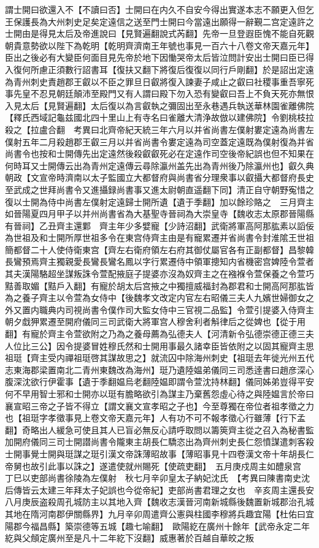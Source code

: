 謂士開曰欲還入不【不讀曰否】士開曰在内久不自安今得出實遂本志不願更入但乞王保護長為大州刺史足矣定遠信之送至門士開曰今當遠出願得一辭覲二宫定遠許之士開由是得見太后及帝進說曰【見賢遍翻說式芮翻】先帝一旦登遐臣愧不能自死觀朝貴意勢欲以陛下為乾明【乾明齊濟南王年號也事見一百六十八卷文帝天嘉元年】臣出之後必有大變臣何面目見先帝於地下因慟哭帝太后皆泣問計安出士開曰臣已得入復何所慮正須數行詔書耳【復扶又翻下將復后復復以同行戶剛翻】於是詔出定遠為青州刺史責趙郡王叡以不臣之罪旦日叡將復入諫妻子咸止之叡曰社稷事重吾寧死事先皇不忍見朝廷顛沛至殿門又有人謂曰殿下勿入恐有變叡曰吾上不負天死亦無恨入見太后【見賢遍翻】太后復以為言叡執之彌固出至永巷遇兵執送華林園雀離佛院【釋氏西域記龜兹國北四十里山上有寺名曰雀離大清浄故倣以建佛院】令劉桃枝拉殺之【拉盧合翻　考異曰北齊帝紀天統三年六月以并省尚書左僕射婁定遠為尚書左僕射五年二月殺趙郡王叡三月以并省尚書令婁定遠為司空蓋定遠既為僕射復為并省尚書令也按和士開傳先出定遠然後殺叡叡死必在定遠作司空後帝紀誤也但不知果在何時耳又士開傳云出為青州定遠傳云尋除瀛州盖先出為青州後乃除瀛州也】叡久典朝政【文宣帝時濟南以太子監國立大都督府與尚書省分理衆事以叡攝大都督府長史至武成之世拜尚書令又進攝録尚書事又進太尉朝直遥翻下同】清正自守朝野寃惜之復以士開為侍中尚書左僕射定遠歸士開所遺【遺于季翻】加以餘珍賂之　三月齊主如晉陽夏四月甲子以并州尚書省為大基聖寺晉祠為大崇皇寺【魏收志太原郡晉陽縣有晉祠】乙丑齊主還鄴　齊主年少多嬖寵【少詩沼翻】武衛將軍高阿那肱素以謟佞為世祖及和士開所厚世祖多令在東宫侍齊主由是有寵累遷并省尚書令封淮隂王世祖簡都督二十人使侍衛東宫【齊左右衛府領左右府其御仗屬官各有正副都督】昌黎韓長鸞預焉齊主獨親愛長鸞長鸞名鳳以字行累遷侍中領軍摠知内省機密宫婢陸令萱者其夫漢陽駱超坐謀叛誅令萱配掖庭子提婆亦沒為奴齊主之在襁褓令萱保養之令萱巧黠善取媚【黠戶入翻】有寵於胡太后宫掖之中獨擅威福封為郡君和士開高阿那肱皆為之養子齊主以令萱為女侍中【後魏孝文改定内官左右昭儀三夫人九嬪世婦御女之外又置内職典内司視尚書令僕作司大監女侍中三官視二品監】令萱引提婆入侍齊主朝夕戱狎累遷至開府儀同三司武衛大將軍宫人穆舍利者斛律后之從婢也【從于用翻】有寵於齊主令萱欲附之乃為之養母薦為弘德夫人【河清新令弘德崇德正德三夫人位比三公】因令提婆冒姓穆氏然和士開用事最久諸幸臣皆依附之以固其寵齊主思祖珽【齊主受内禪祖珽啓其謀故思之】就流囚中除海州刺史【祖珽去年徙光州五代志東海郡梁置南北二青州東魏改為海州】珽乃遺陸媪弟儀同三司悉逹書曰趙彦深心腹深沈欲行伊霍事【遺于季翻媪烏老翻陸媪即謂令萱沈持林翻】儀同姊弟豈得平安何不早用智士邪和士開亦以珽有膽略欲引為謀主乃棄舊怨虛心待之與陸媪言於帝曰襄宣昭三帝之子皆不得立【謂文襄文宣孝昭之子也】今至尊獨在帝位者祖孝徵之力也【祖珽字孝徵事見上卷文帝天嘉元年】人有功不可不報孝徵心行雖薄【行下孟翻】奇略出人緩急可使且其人已盲必無反心請呼取問以籌筴齊主從之召入為秘書監加開府儀同三司士開譛尚書令隴東主胡長仁驕恣出為齊州刺史長仁怨憤謀遣刺客殺士開事覺士開與珽謀之珽引漢文帝誅薄昭故事【薄昭事見十四卷漢文帝十年胡長仁帝舅也故引此事以誅之】遂遣使就州賜死【使疏吏翻】　五月庚戍周主如醴泉宫　丁巳以吏部尚書徐陵為左僕射　秋七月辛卯皇太子納妃沈氏　【考異曰陳書南史沈后傳皆云太建三年拜太子妃誤也今從帝紀】吏部尚書君理之女也　辛亥周主還長安　八月庚辰盗殺周孔城防主以其地入齊【魏收志漢晉河南新城縣後魏置新城郡治孔城其地在隋河南郡伊關縣界】九月辛卯周遣齊公憲與柱國李穆將兵趣宜陽【杜佑曰宜陽郡今福昌縣】築崇德等五城【趣七喻翻】　歐陽紇在廣州十餘年【武帝永定二年紇與父頠定廣州至是凡十二年紇下沒翻】威惠著於百越自華皎之叛